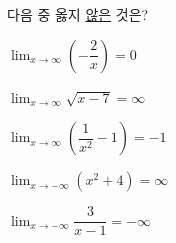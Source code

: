 다음 중 옳지 \underline{않은} 것은?
\begin{choicesii}{\rule[-3ex]{0pt}{8ex}$\displaystyle\lim_{x\to\infty}\left(-\dfrac{2}{x}\right)=0$}{\rule[-3ex]{0pt}{8ex}$\displaystyle\lim_{x\to\infty}\sqrt{x-7}=\infty$}{\rule[-3ex]{0pt}{8ex}$\displaystyle\lim_{x\to\infty}\left(\dfrac{1}{x^2}-1\right)=-1$}{\rule[-3ex]{0pt}{8ex}$\displaystyle\lim_{x\to-\infty}(x^2+4)=\infty$}{\rule[-3ex]{0pt}{8ex}$\displaystyle\lim_{x\to-\infty}\dfrac{3}{x-1}=-\infty$}\end{choicesii}
